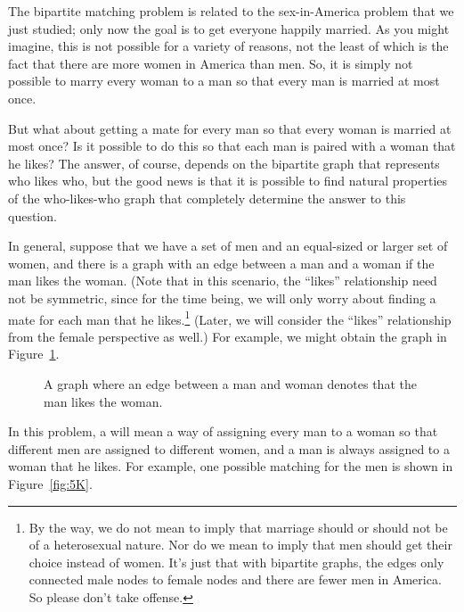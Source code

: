 The bipartite matching problem is related to the sex-in-America
problem that we just studied; only now the goal is to get everyone
happily married.  As you might imagine, this is not possible for a
variety of reasons, not the least of which is the fact that there are
more women in America than men.  So, it is simply not possible to
marry every woman to a man so that every man is married at most once.

But what about getting a mate for every man so that every woman is married
at most once?  Is it possible to do this so that each man is paired with a
woman that he likes?  The answer, of course, depends on the bipartite graph
that represents who likes who, but the good news is that it is possible to
find natural properties of the who-likes-who graph that completely
determine the answer to this question.

In general, suppose that we have a set of men and an equal-sized or
larger set of women, and there is a graph with an edge between a man
and a woman if the man likes the woman.  (Note that in this scenario,
the ``likes'' relationship need not be symmetric, since for the time
being, we will only worry about finding a mate for each man that he
likes.\footnote{By the way, we do not mean to imply that marriage
  should or should not be of a heterosexual nature.  Nor do we mean to
  imply that men should get their choice instead of women.  It's just
  that with bipartite graphs, the edges only connected male nodes to
  female nodes and there are fewer men in America.  So please don't
  take offense.}  (Later, we will consider the ``likes'' relationship
from the female perspective as well.)  For example, we might obtain
the graph in Figure~\ref{fig:5J}.

\begin{figure}



\caption{A graph where an edge between a man and woman denotes that
  the man likes the woman.}

\label{fig:5J}

\end{figure}

In this problem, a  will mean a way of assigning every
man to a woman so that different men are assigned to different women,
and a man is always assigned to a woman that he likes.  For example,
one possible matching for the men is shown in Figure~\ref{fig:5K}.

